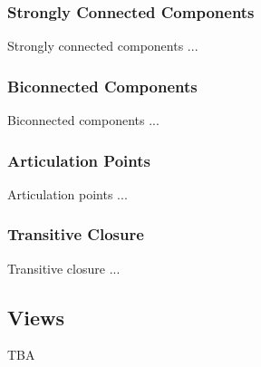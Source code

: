 \documentclass[10pt,onecolumn]{article}
\begin{document}
\subsubsection{Strongly Connected Components}
Strongly connected components \cite{REF_} ...

\subsubsection{Biconnected Components}
Biconnected components \cite{REF_} ...

\subsubsection{Articulation Points}
Articulation points \cite{REF_} ...

\subsubsection{Transitive Closure}
Transitive closure \cite{REF_} ...

%

\subsection{Views}
TBA
\end{document}
